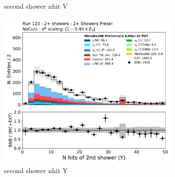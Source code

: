 \begin{figure}[H]
\begin{subfigure}{0.3\textwidth}
    \caption{second shower nhit V}
    \end{subfigure}
    \begin{subfigure}{0.3\textwidth}
    \includegraphics[width=1.0\textwidth]{Sidebands/Figures/TwoShr_1e0pSel/Presel/secondshower_Y_nhit.pdf}
    \caption{second shower nhit Y}
    \end{subfigure}
    \caption{} 
    \label{fig:HE_1eNp_1}
\end{figure}

